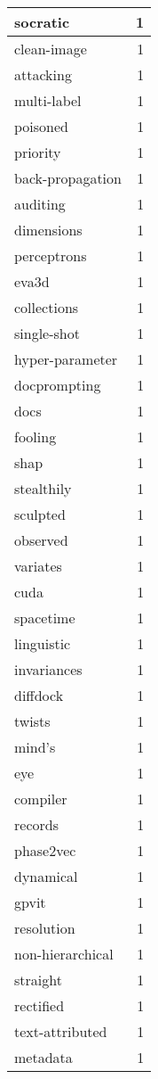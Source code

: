 \begin{table}[h]
\begin{tabular}{|l|r|}
\hline
socratic & 1 \\
\hline
clean-image & 1 \\
\hline
attacking & 1 \\
\hline
multi-label & 1 \\
\hline
poisoned & 1 \\
\hline
priority & 1 \\
\hline
back-propagation & 1 \\
\hline
auditing & 1 \\
\hline
dimensions & 1 \\
\hline
perceptrons & 1 \\
\hline
eva3d & 1 \\
\hline
collections & 1 \\
\hline
single-shot & 1 \\
\hline
hyper-parameter & 1 \\
\hline
docprompting & 1 \\
\hline
docs & 1 \\
\hline
fooling & 1 \\
\hline
shap & 1 \\
\hline
stealthily & 1 \\
\hline
sculpted & 1 \\
\hline
observed & 1 \\
\hline
variates & 1 \\
\hline
cuda & 1 \\
\hline
spacetime & 1 \\
\hline
linguistic & 1 \\
\hline
invariances & 1 \\
\hline
diffdock & 1 \\
\hline
twists & 1 \\
\hline
mind's & 1 \\
\hline
eye & 1 \\
\hline
compiler & 1 \\
\hline
records & 1 \\
\hline
phase2vec & 1 \\
\hline
dynamical & 1 \\
\hline
gpvit & 1 \\
\hline
resolution & 1 \\
\hline
non-hierarchical & 1 \\
\hline
straight & 1 \\
\hline
rectified & 1 \\
\hline
text-attributed & 1 \\
\hline
metadata & 1 \\

\end{tabular}
\end{table}
